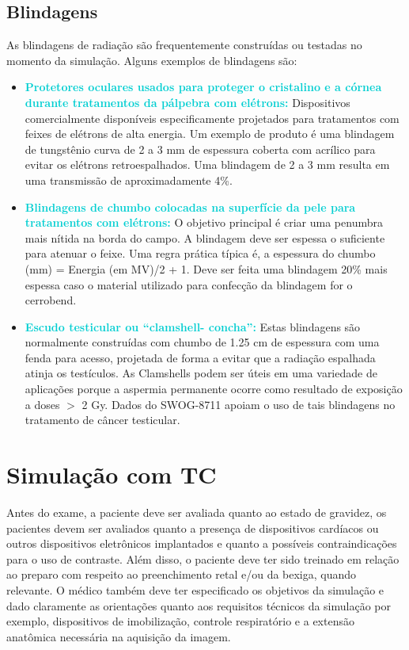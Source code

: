 \documentclass[11pt,a4paper]{article}
\newcounter{exemplo}
\begin{document}
\subsection*{Blindagens}

	As blindagens de radiação são frequentemente construídas ou testadas no momento da simulação. Alguns exemplos de blindagens são:

	\begin{itemize}[label=\textcolor{CarnationPink}{$\blacksquare$}]
		\item \textcolor{DarkTurquoise}{\textbf{Protetores oculares usados para proteger o cristalino e a córnea durante tratamentos da pálpebra com elétrons:}} Dispositivos comercialmente disponíveis especificamente projetados para tratamentos com feixes de elétrons de alta energia. Um exemplo de produto é uma blindagem de tungstênio curva de 2 a 3 mm de espessura coberta com acrílico para evitar os elétrons retroespalhados. Uma blindagem de 2 a 3 mm resulta em uma transmissão de aproximadamente 4\%.		

		\item \textcolor{DarkTurquoise}{\textbf{Blindagens de chumbo colocadas na superfície da pele para tratamentos com elétrons:}} O objetivo principal é criar uma penumbra mais nítida na borda do campo. A blindagem deve ser espessa o suficiente para atenuar o feixe. Uma regra prática típica é, a espessura do chumbo (mm) = Energia (em MV)/2 + 1. Deve ser feita uma blindagem 20\% mais espessa caso o material utilizado para confecção da blindagem for o cerrobend.		
		
		\item \textcolor{DarkTurquoise}{\textbf{Escudo testicular ou “clamshell- concha”:}} Estas blindagens são normalmente construídas com chumbo de 1.25 cm de espessura com uma fenda para acesso, projetada de forma a evitar que a radiação espalhada atinja os testículos. As Clamshells podem ser úteis em uma variedade de aplicações porque a aspermia permanente ocorre como resultado de exposição a doses $>$ 2 Gy. Dados do SWOG-8711 apoiam o uso de tais blindagens no tratamento de câncer testicular.
	\end{itemize}

\section{Simulação com TC}

	Antes do exame, a paciente deve ser avaliada quanto ao estado de gravidez, os pacientes devem ser avaliados quanto a presença de dispositivos cardíacos ou outros dispositivos eletrônicos implantados e quanto a possíveis contraindicações para o uso de contraste. Além disso, o paciente deve ter sido treinado em relação ao preparo com respeito ao preenchimento retal e/ou da bexiga, quando relevante. O médico também deve ter especificado os objetivos da simulação e dado claramente as orientações quanto aos requisitos técnicos da simulação por exemplo, dispositivos de imobilização, controle respiratório e a extensão anatômica necessária na aquisição da imagem.
\end{document}
